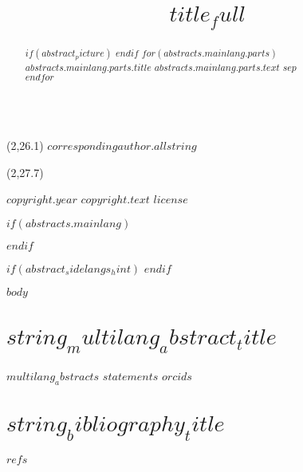 \documentclass[oneside,a4paper]{shaj}
\title{$title_full$}
\begin{document}
\thispagestyle{empty}
\begin{textblock}{17.00}(2,26.1)
{\color{themecolor1}\noindent\hrulefill}
\vskip3.4mm
\noindent
\fontsize{7}{9}\selectfont{\sanssemibold $string_contact$ }\sffamily $correspondingauthor.allstring$

\end{textblock}
\begin{textblock}{17.00}(2,27.7)
{\fontsize{6.3}{9}\selectfont\noindent $copyright.year$ $copyright.text$ $license$

}
\end{textblock}




$if(abstracts.mainlang)$
\begin{abstract}
$if(abstract_picture)$
\emergencystretch 1pt
$endif$
$for(abstracts.mainlang.parts)$
{\bfseries\color{themecolor1}$abstracts.mainlang.parts.title$} $abstracts.mainlang.parts.text$ $sep$\\ 	
$endfor$\\
\\
\noindent
\end{abstract}
$endif$
	
	
$if(abstract_sidelangs_hint)$
\newcommand{\abstracthint}{$abstract_sidelangs_hint$}
$endif$
\enlargethispage{-4\baselineskip}
\maketitle%
	
	
	
	
\begin{multicols}{2}
	\raggedcolumns
	$body$
	\raggedcolumns
	\section{$string_multilang_abstract_title$}
	$multilang_abstracts$
	\raggedcolumns
	$statements$
	\raggedcolumns
	$orcids$
	\raggedcolumns
	
	\section{$string_bibliography_title$}	
	$refs$
\end{multicols}
\end{document}
